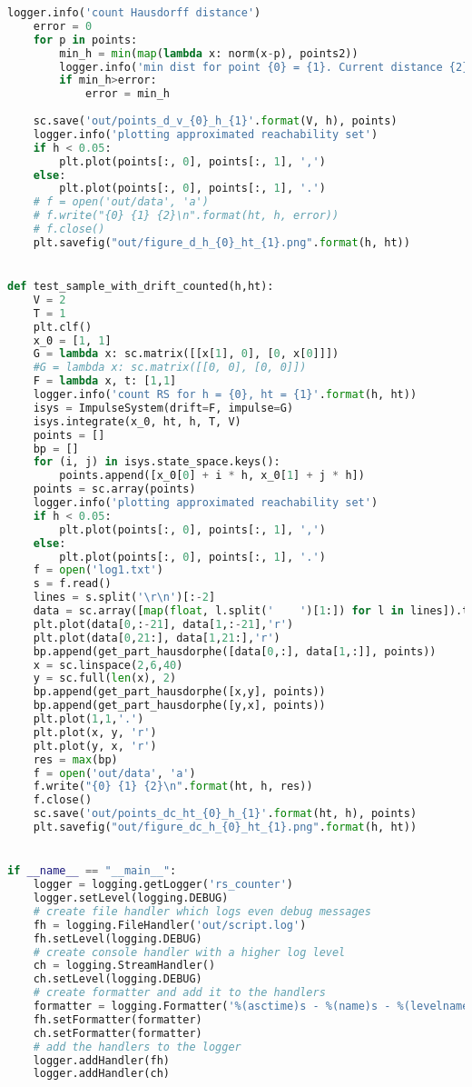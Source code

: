 \begin{lstlisting}[language=Python,
caption={Интерфейс Impulse System}]
    logger.info('count Hausdorff distance')
    error = 0
    for p in points:
        min_h = min(map(lambda x: norm(x-p), points2))
        logger.info('min dist for point {0} = {1}. Current distance {2}'.format(p, min_h,error))
        if min_h>error:
            error = min_h
    
    sc.save('out/points_d_v_{0}_h_{1}'.format(V, h), points)
    logger.info('plotting approximated reachability set')
    if h < 0.05:
        plt.plot(points[:, 0], points[:, 1], ',')
    else:
        plt.plot(points[:, 0], points[:, 1], '.')
    # f = open('out/data', 'a')
    # f.write("{0} {1} {2}\n".format(ht, h, error))
    # f.close()
    plt.savefig("out/figure_d_h_{0}_ht_{1}.png".format(h, ht))


def test_sample_with_drift_counted(h,ht):
    V = 2
    T = 1
    plt.clf()
    x_0 = [1, 1]
    G = lambda x: sc.matrix([[x[1], 0], [0, x[0]]])
    #G = lambda x: sc.matrix([[0, 0], [0, 0]])
    F = lambda x, t: [1,1]
    logger.info('count RS for h = {0}, ht = {1}'.format(h, ht))
    isys = ImpulseSystem(drift=F, impulse=G)
    isys.integrate(x_0, ht, h, T, V)
    points = []
    bp = []
    for (i, j) in isys.state_space.keys():
        points.append([x_0[0] + i * h, x_0[1] + j * h])
    points = sc.array(points)
    logger.info('plotting approximated reachability set')
    if h < 0.05:
        plt.plot(points[:, 0], points[:, 1], ',')
    else:
        plt.plot(points[:, 0], points[:, 1], '.')
    f = open('log1.txt')
    s = f.read()
    lines = s.split('\r\n')[:-2]
    data = sc.array([map(float, l.split('    ')[1:]) for l in lines]).transpose()
    plt.plot(data[0,:-21], data[1,:-21],'r')
    plt.plot(data[0,21:], data[1,21:],'r')
    bp.append(get_part_hausdorphe([data[0,:], data[1,:]], points))
    x = sc.linspace(2,6,40)
    y = sc.full(len(x), 2)
    bp.append(get_part_hausdorphe([x,y], points))
    bp.append(get_part_hausdorphe([y,x], points))
    plt.plot(1,1,'.')
    plt.plot(x, y, 'r')
    plt.plot(y, x, 'r')
    res = max(bp)
    f = open('out/data', 'a')
    f.write("{0} {1} {2}\n".format(ht, h, res))
    f.close()
    sc.save('out/points_dc_ht_{0}_h_{1}'.format(ht, h), points)
    plt.savefig("out/figure_dc_h_{0}_ht_{1}.png".format(h, ht))


if __name__ == "__main__":
    logger = logging.getLogger('rs_counter')
    logger.setLevel(logging.DEBUG)
    # create file handler which logs even debug messages
    fh = logging.FileHandler('out/script.log')
    fh.setLevel(logging.DEBUG)
    # create console handler with a higher log level
    ch = logging.StreamHandler()
    ch.setLevel(logging.DEBUG)
    # create formatter and add it to the handlers
    formatter = logging.Formatter('%(asctime)s - %(name)s - %(levelname)s - %(message)s')
    fh.setFormatter(formatter)
    ch.setFormatter(formatter)
    # add the handlers to the logger
    logger.addHandler(fh)
    logger.addHandler(ch)


\end{lstlisting}
